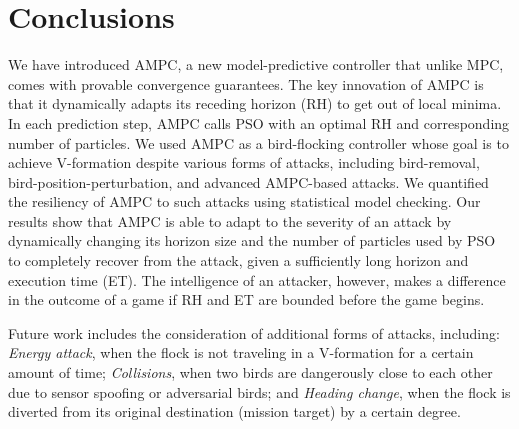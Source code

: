 \vspace*{-0.6ex}
\section{Conclusions}
\label{sec:conclusion}

We have introduced AMPC, a new model-predictive controller that unlike MPC, comes with provable convergence guarantees. The key innovation of AMPC is that it dynamically adapts its receding horizon (RH) to get out of local minima. In each prediction step, AMPC calls
PSO with an optimal RH and corresponding number of particles. We used AMPC as a
bird-flocking controller whose goal is to achieve V-formation despite various forms of attacks, including bird-removal, bird-position-perturbation, and advanced AMPC-based attacks.  We quantified the resiliency of AMPC to such attacks using statistical model checking.  Our results show that AMPC is able to adapt to the severity of an attack by dynamically changing its horizon size and the number of particles used by PSO to completely recover from the attack, given a sufficiently long horizon and execution time (ET).  The intelligence of an attacker, however, makes a difference in the outcome of a game if RH and ET are bounded before the game begins.

Future work includes the consideration of additional forms of attacks, including: \emph{Energy attack}, when the flock is not traveling in a V-formation for a certain amount of time; \emph{Collisions}, when two birds are dangerously close to each other due to sensor spoofing or adversarial birds; and \emph{Heading change}, when the flock is diverted from its original destination (mission target) by a certain degree.

